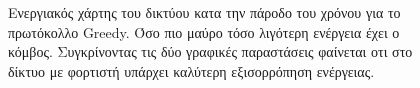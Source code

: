 \begin{figure}[H]
  \centering
  \caption{Ενεργιακός χάρτης του δικτύου κατα την πάροδο του χρόνου για το πρωτόκολλο Greedy. Όσο πιο μαύρο τόσο λιγότερη ενέργεια έχει ο κόμβος. Συγκρίνοντας τις δύο
γραφικές παραστάσεις φαίνεται οτι στο δίκτυο με φορτιστή υπάρχει καλύτερη εξισορρόπηση ενέργειας.}
  \label{fig:1exp_4_1}
\end{figure}

